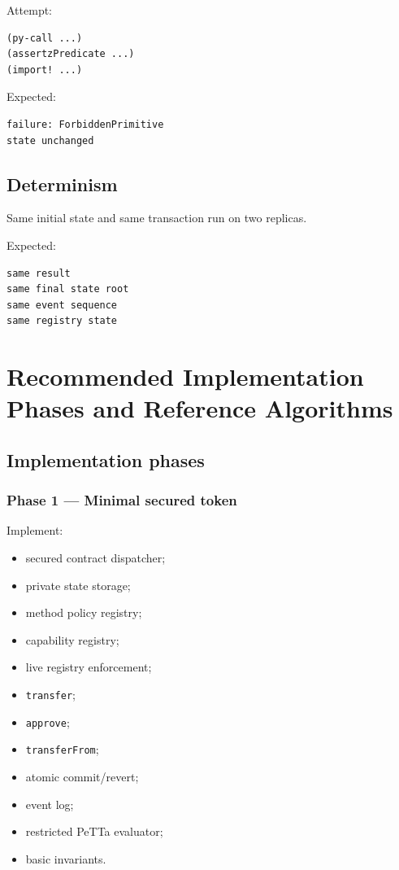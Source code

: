 \documentclass[11pt]{article}
\newcommand{\PeTTa}{PeTTa}
\newcommand{\code}[1]{\texttt{#1}}
\begin{document}
Attempt:

\begin{lstlisting}
(py-call ...)
(assertzPredicate ...)
(import! ...)
\end{lstlisting}

Expected:

\begin{lstlisting}
failure: ForbiddenPrimitive
state unchanged
\end{lstlisting}

\subsection{Determinism}

Same initial state and same transaction run on two replicas.

Expected:

\begin{lstlisting}
same result
same final state root
same event sequence
same registry state
\end{lstlisting}



\section{Recommended Implementation Phases and Reference Algorithms}

\subsection{Implementation phases}

\subsubsection{Phase 1 --- Minimal secured token}

Implement:

\begin{itemize}
  \item secured contract dispatcher;
  \item private state storage;
  \item method policy registry;
  \item capability registry;
  \item live registry enforcement;
  \item \code{transfer};
  \item \code{approve};
  \item \code{transferFrom};
  \item atomic commit/revert;
  \item event log;
  \item restricted \PeTTa{} evaluator;
  \item basic invariants.
\end{itemize}
\end{document}
